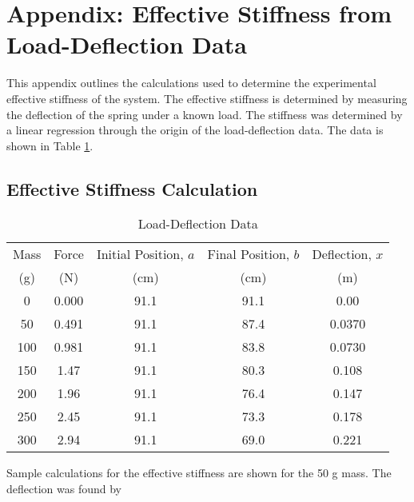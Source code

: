 \section{Appendix: Effective Stiffness from Load-Deflection Data}
\label{app:spring_stiffness}
This appendix outlines the calculations used to determine the experimental effective stiffness of the system. The effective stiffness is determined by measuring the deflection of the spring under a known load. The stiffness was determined by a linear regression through the origin of the load-deflection data. The data is shown in Table \ref{tab:load_deflection}.

\subsection{Effective Stiffness Calculation}
\begin{table}[H]
    \centering
    \caption{Load-Deflection Data}
    \label{tab:load_deflection}
    \begin{tabular}{ccccc}
    \toprule
        Mass & Force & Initial Position, $a$ & Final Position, $b$ & Deflection, $x$ \\
        (g) & (N) & (cm) & (cm) & (m) \\
        \midrule
        0 & 0.000 & 91.1 & 91.1 & 0.00 \\
        50 & 0.491 & 91.1 & 87.4 & 0.0370 \\
        100 & 0.981 & 91.1 & 83.8 & 0.0730 \\
        150 & 1.47 & 91.1 & 80.3 & 0.108 \\
        200 & 1.96 & 91.1 & 76.4 & 0.147 \\
        250 & 2.45 & 91.1 & 73.3 & 0.178 \\
        300 & 2.94 & 91.1 & 69.0 & 0.221 \\
        \bottomrule
    \end{tabular}
\end{table}
Sample calculations for the effective stiffness are shown for the 50 g mass. The deflection was found by

